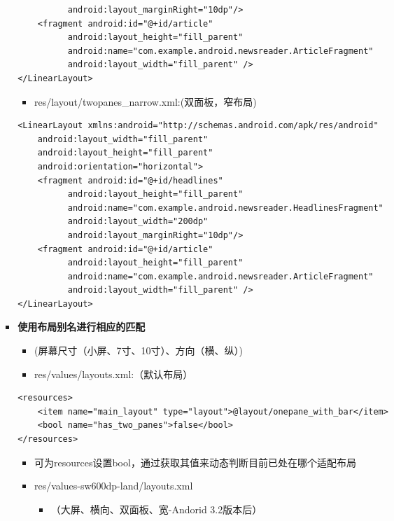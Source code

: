 \documentclass[9pt, b5paper]{article}
\begin{document}
\begin{enumerate}
\begin{enumerate}
\begin{enumerate}
\begin{itemize}
\begin{verbatim}
          android:layout_marginRight="10dp"/>
    <fragment android:id="@+id/article"
          android:layout_height="fill_parent"
          android:name="com.example.android.newsreader.ArticleFragment"
          android:layout_width="fill_parent" />
</LinearLayout>
\end{verbatim}
\begin{itemize}
\item res/layout/twopanes\_narrow.xml:(双面板，窄布局)
\end{itemize}
\begin{verbatim}
<LinearLayout xmlns:android="http://schemas.android.com/apk/res/android"
    android:layout_width="fill_parent"
    android:layout_height="fill_parent"
    android:orientation="horizontal">
    <fragment android:id="@+id/headlines"
          android:layout_height="fill_parent"
          android:name="com.example.android.newsreader.HeadlinesFragment"
          android:layout_width="200dp"
          android:layout_marginRight="10dp"/>
    <fragment android:id="@+id/article"
          android:layout_height="fill_parent"
          android:name="com.example.android.newsreader.ArticleFragment"
          android:layout_width="fill_parent" />
</LinearLayout>
\end{verbatim}
\item \textbf{使用布局别名进行相应的匹配}
\begin{itemize}
\item (屏幕尺寸（小屏、7寸、10寸）、方向（横、纵）)
\item res/values/layouts.xml:（默认布局）
\end{itemize}
\begin{verbatim}
<resources>  
    <item name="main_layout" type="layout">@layout/onepane_with_bar</item>  
    <bool name="has_two_panes">false</bool>  
</resources>
\end{verbatim}
\begin{itemize}
\item 可为resources设置bool，通过获取其值来动态判断目前已处在哪个适配布局
\item res/values-sw600dp-land/layouts.xml
\begin{itemize}
\item （大屏、横向、双面板、宽-Andorid 3.2版本后）
\end{itemize}
\end{itemize}
\begin{verbatim}

\end{verbatim}
\end{itemize}
\end{enumerate}
\end{enumerate}
\end{enumerate}
\end{document}
